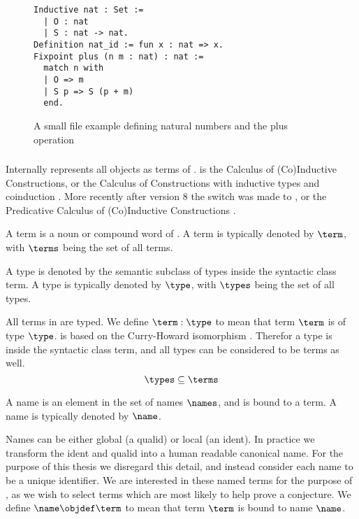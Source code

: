 \begin{figure}[H]
	\begin{lstlisting}[language=Coq, mathescape]
Inductive nat : Set :=
  | O : nat
  | S : nat -> nat.
Definition nat_id := fun x : nat => x.
Fixpoint plus (n m : nat) : nat :=
  match n with
  | O => m
  | S p => S (p + m)
  end.
	\end{lstlisting}
	\caption{A small \gallina \coq file example defining natural numbers and the plus operation}
\end{figure}
\subsubsection{\pcic}

Internally \coq represents all objects as terms  of \cic{}.
\cic is the Calculus of (Co)Inductive Constructions,
or the Calculus of Constructions \cite{coquand1988calculus} with inductive types and coinduction \cite{huet1987induction} \cite{coquand1990inductively}.
More recently after \coq version 8 the switch was made to \pcic, or the Predicative Calculus of (Co)Inductive Constructions \cite{bertot2013interactive}.

\begin{definition}[term]
	A term is a noun or compound word of \pcic.
	A term is typically denoted by $\term$,
	with $\terms$ being the set of all terms.
\end{definition}

\begin{definition}[type]\label{def:type}
	A type is denoted by the semantic subclass of types inside the syntactic class term.
	A type is typically denoted by $\type$, with $\types$ being the set of all types.
\end{definition}

All terms in \coq are typed.
We define $\term : \type$ to mean that term $\term$ is of type $\type$.
\coq is based on the Curry-Howard isomorphism \cite{howard1980formulae}.
Therefor a type is inside the syntactic class term, and all types can be considered to be terms as well.
\[ \types \subseteq \terms \]

\begin{definition}[name]
	A name is an element in the set of names $\names$, and is bound to a term. A name is typically denoted by $\name$.
\end{definition}
Names can be either global (a qualid) or local (an ident).
In practice we transform the ident and qualid into a human readable canonical name.
For the purpose of this thesis we disregard this detail, and instead consider each name to be a unique identifier.
We are interested in these named terms for the purpose of \premiseselection,
as we wish to select terms which are most likely to help prove a conjecture.
We define $\name \objdef \term$ to mean that term $\term$ is bound to name $\name$.

